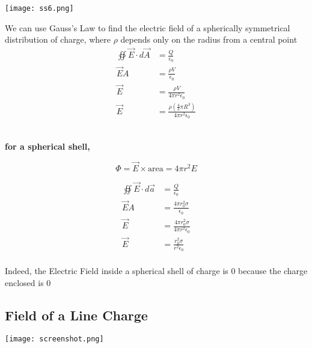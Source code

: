 \documentclass[svgnames]{article}
\begin{document}
\vspace{20px}

\begin{center}
\texttt{[image: ss6.png]}
\end{center}


\vspace{20px}

We can use Gauss's Law to find the electric field of a spherically symmetrical
distribution of charge, where $\rho$ depends only on the radius from a central point \\


\begin{align*}
\oiint \vec{E} \cdot d\vec{A} &= \frac{Q}{\epsilon_0} \\
\vec{E} A &= \frac{\rho V}{\epsilon_0} \\ 
\vec{E} &= \frac{\rho V}{4 \pi r^2 \epsilon_0} \\
\vec{E} &= \frac{\rho (\frac{4}{3}\pi R^3)}{4 \pi r^2 \epsilon_0}
\end{align*}\\
\begin{center}


\textbf{for a spherical shell,}
\end{center}

\[ \Phi = \vec{E} \times \text{area} = 4\pi r^2 E \] 

\begin{align*} 
\oiint \vec{E} \cdot d\vec{a} &= \frac{Q}{\epsilon_0} \\
\vec{E}A &= \frac{4\pi r_0^2 \sigma}{\epsilon_0} \\ 
\vec{E} &= \frac{4\pi r_0^2 \sigma}{4\pi r^2 \epsilon_0} \\ 
\vec{E} &= \frac{r_0^2 \sigma}{r^2 \epsilon_0}
\end{align*} \\


Indeed, the Electric Field inside a spherical shell of charge is 0 because the charge enclosed is 0 \\

\subsection{Field of a Line Charge} 

\vspace{20px} 

\begin{center}
\texttt{[image: screenshot.png]}
\end{center} 
\end{document}
